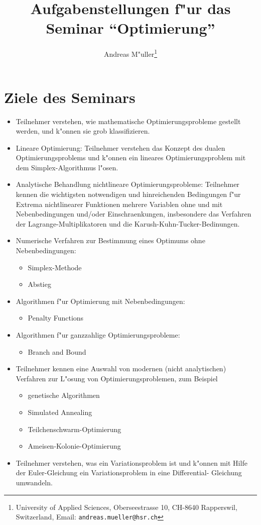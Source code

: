 \documentclass[a4paper,12pt]{article}
\begin{document}
\title{Aufgabenstellungen f"ur das Seminar ``Optimierung''}
\author{Andreas M"uller\footnote{
University of Applied Sciences, Oberseestrasse 10, CH-8640 Rapperswil,
Switzerland, Email: {\tt andreas.mueller@hsr.ch}}}
\date{}
\maketitle
\section{Ziele des Seminars}
\begin{itemize}
\item
Teilnehmer verstehen, wie mathematische Optimierungsprobleme gestellt
werden, und k"onnen sie grob klassifizieren.
\item
Lineare Optimierung: Teilnehmer verstehen das Konzept des dualen
Optimierungsproblems und k"onnen ein lineares Optimierungsproblem
mit dem Simplex-Algorithmus l"osen.
\item
Analytische Behandlung nichtlineare Optimierungsprobleme:  Teilnehmer
kennen die wichtigsten notwendigen und hinreichenden Bedingungen f"ur
Extrema nichtlinearer Funktionen mehrere Variablen ohne und mit
Nebenbedingungen und/oder Einschraenkungen, insbesondere das Verfahren
der Lagrange-Multiplikatoren und die Karush-Kuhn-Tucker-Bedinungen.
\item
Numerische Verfahren zur Bestimmung eines Optimums ohne Nebenbedingungen:
\begin{itemize}
\item Simplex-Methode
\item Abstieg
\end{itemize}
\item
Algorithmen f"ur Optimierung mit Nebenbedingungen:
\begin{itemize}
\item Penalty Functions
\end{itemize}

\item
Algorithmen f"ur ganzzahlige Optimierungsprobleme:
\begin{itemize}
\item Branch and Bound
\end{itemize}

\item
Teilnehmer kennen eine Auswahl von modernen (nicht analytischen) Verfahren
zur L"osung von Optimierungsproblemen, zum Beispiel
\begin{itemize}
\item genetische Algorithmen
\item Simulated Annealing
\item Teilchenschwarm-Optimierung
\item Ameisen-Kolonie-Optimierung
\end{itemize}

\item
Teilnehmer verstehen, was ein Variationsproblem ist und k"onnen mit
Hilfe der Euler-Gleichung ein Variationsproblem in eine Differential-
Gleichung umwandeln.
\end{itemize}
\end{document}
